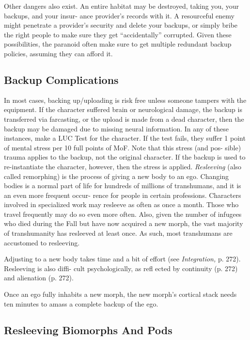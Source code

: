 Other dangers also exist. An entire habitat may be 
destroyed, taking you, your backups, and your insur-
ance provider's records with it. A resourceful enemy 
might penetrate a provider's security and delete your 
backups, or simply bribe the right people to make 
sure they get ``accidentally'' corrupted. Given these 
possibilities, the paranoid often make sure to get 
multiple redundant backup policies, assuming they 
can afford it.

\subsection{Backup Complications}

In most cases, backing up/uploading is risk free unless 
someone tampers with the equipment. If the character 
suffered brain or neurological damage, the backup is 
transferred via farcasting, or the upload is made from 
a dead character, then the backup may be damaged 
due to missing neural information. In any of these 
instances, make a LUC Test for the character. If the 
test fails, they suffer 1 point of mental stress per 10 
full points of MoF. Note that this stress (and pos-
sible) trauma applies to the backup, not the original 
character. If the backup is used to re-instantiate the 
character, however, then the stress is applied.
\textit{Resleeving} (also called remorphing) is the process 
of giving a new body to an ego. Changing bodies 
is a normal part of life for hundreds of millions of 
transhumans, and it is an even more frequent occur-
rence for people in certain professions. Characters 
involved in specialized work may resleeve as often as 
once a month. Those who travel frequently may do so 
even more often. Also, given the number of infugees 
who died during the Fall but have now acquired a 
new morph, the vast majority of transhumanity has 
resleeved at least once. As such, most transhumans are 
accustomed to resleeving.

Adjusting to a new body takes time and a bit of 
effort (see \textit{Integration,} p. 272). Resleeving is also diffi-
cult psychologically, as refl ected by continuity (p. 272) 
and alienation (p. 272).

Once an ego fully inhabits a new morph, the new 
morph's cortical stack needs ten minutes to amass a 
complete backup of the ego.

\subsection{Resleeving Biomorphs And Pods}


